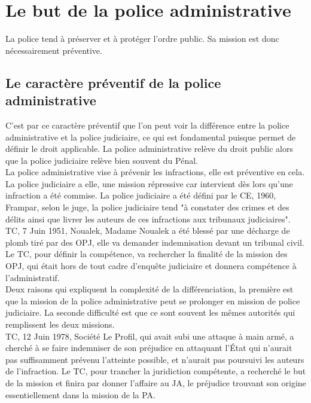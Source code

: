 \documentclass[10pt, a4paper, openany]{book}
\begin{document}
\section{Le but de la police administrative}

La police tend à préserver et à protéger l'ordre public. Sa mission est donc nécessairement préventive.

\subsection{Le caractère préventif de la police administrative}

C'est par ce caractère préventif que l'on peut voir la différence entre la police administrative et la police judiciaire, ce qui est fondamental puisque permet de définir le droit applicable. La police administrative relève du droit public alors que la police judiciaire relève bien souvent du Pénal. \\
La police administrative vise à prévenir les infractions, elle est préventive en cela. La police judiciaire a elle, une mission répressive car intervient dès lors qu'une infraction a été commise. La police judiciaire a été défini par le CE, 1960, Frampar, selon le juge, la police judiciaire tend "à constater des crimes et des délits ainsi que livrer les auteurs de ces infractions aux tribunaux judiciaires". TC, 7 Juin 1951, Noualek, Madame Noualek a été blessé par une décharge de plomb tiré par des OPJ, elle va demander indemnisation devant un tribunal civil. Le TC, pour définir la compétence, va rechercher la finalité de la mission des OPJ, qui était hors de tout cadre d'enquête judiciaire et donnera compétence à l'administratif. \\
Deux raisons qui expliquent la complexité de la différenciation, la première est que la mission de la police administrative peut se prolonger en mission de police judiciaire. La seconde difficulté est que ce sont souvent les mêmes autorités qui remplissent les deux missions. \\
TC, 12 Juin 1978, Société Le Profil, qui avait subi une attaque à main armé, a cherché à se faire indemniser de son préjudice en attaquant l'État qui n'aurait pas suffisamment prévenu l'atteinte possible, et n'aurait pas poursuivi les auteurs de l'infraction. Le TC, pour trancher la juridiction compétente, a recherché le but de la mission et finira par donner l'affaire au JA, le préjudice trouvant son origine essentiellement dans la mission de la PA. 
\end{document}
